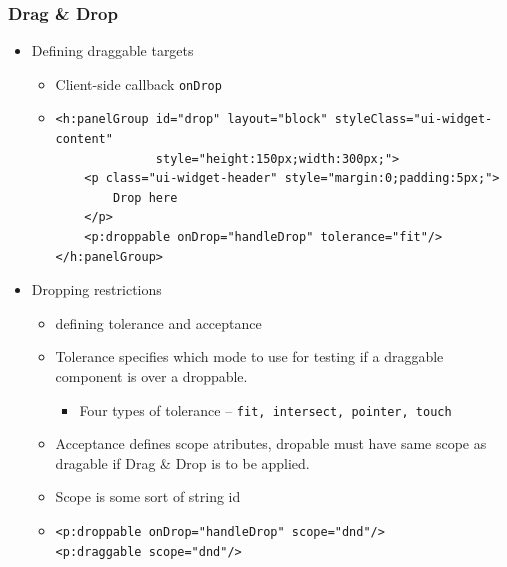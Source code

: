\documentclass[10pt,xcolor=pdflatex]{beamer}
\begin{document}
\begin{frame}[containsverbatim]\frametitle{Drag \& Drop}
  \begin{itemize}
    \item Defining draggable targets
	  \begin{itemize}
		\item Client-side callback \texttt{onDrop}
		\item[] \begin{footnotesize} \begin{verbatim}
<h:panelGroup id="drop" layout="block" styleClass="ui-widget-content"
              style="height:150px;width:300px;">
    <p class="ui-widget-header" style="margin:0;padding:5px;">
        Drop here
    </p>
    <p:droppable onDrop="handleDrop" tolerance="fit"/>
</h:panelGroup>			
			\end{verbatim} \end{footnotesize}
	  \end{itemize}
    \item Dropping restrictions
	  \begin{itemize}
	    \item defining tolerance and acceptance
	    \item Tolerance specifies which mode to use for testing if a draggable component is over a droppable.
          \begin{itemize}
            \item Four types of tolerance -- \texttt{fit, intersect, pointer, touch}
          \end{itemize}
        \item Acceptance defines scope atributes, dropable must have same scope as dragable if Drag \& Drop is to be applied.
        \item Scope is some sort of string id
        \item[] \begin{footnotesize} \begin{verbatim}
<p:droppable onDrop="handleDrop" scope="dnd"/>    
<p:draggable scope="dnd"/>
\end{verbatim} \end{footnotesize}
    \end{itemize}
  \end{itemize}
\end{frame}
\end{document}
